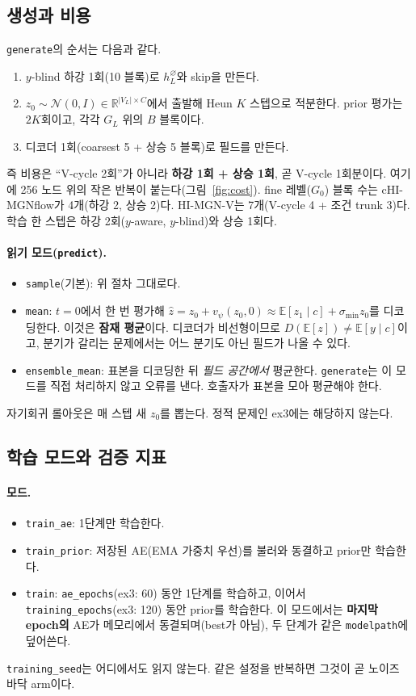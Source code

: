 \documentclass[11pt]{article}
\newcommand{\E}{\mathbb{E}}
\newcommand{\N}{\mathcal{N}}
\newcommand{\R}{\mathbb{R}}
\newcommand{\code}[1]{\texttt{#1}}
\begin{document}
\subsection{생성과 비용}\label{sec:chi-cost}

\code{generate}의 순서는 다음과 같다.
\begin{enumerate}
\item $y$-blind 하강 1회(10 블록)로 $h_L^{\varnothing}$와 skip을 만든다.
\item $z_0\sim\N(0,I)\in\R^{|V_L|\times C}$에서 출발해 Heun $K$ 스텝으로
  적분한다. prior 평가는 $2K$회이고, 각각 $G_L$ 위의 $B$ 블록이다.
\item 디코더 1회(coarsest 5 + 상승 5 블록)로 필드를 만든다.
\end{enumerate}
즉 비용은 ``V-cycle 2회''가 아니라 \textbf{하강 1회 + 상승 1회}, 곧 V-cycle
1회분이다. 여기에 256 노드 위의 작은 반복이 붙는다(그림~\ref{fig:cost}).
fine 레벨($G_0$) 블록 수는 cHI-MGNflow가 4개(하강 2, 상승 2)다. HI-MGN-V는
7개(V-cycle 4 + 조건 trunk 3)다. 학습 한 스텝은 하강 2회($y$-aware, $y$-blind)와
상승 1회다.

\paragraph{읽기 모드(\code{predict}).}
\begin{itemize}
\item \code{sample}(기본): 위 절차 그대로다.
\item \code{mean}: $t=0$에서 한 번 평가해 $\hat z = z_0 + v_\psi(z_0, 0) \approx
  \E[z_1\mid c] + \sigma_{\min}z_0$를 디코딩한다. 이것은 \textbf{잠재 평균}이다.
  디코더가 비선형이므로 $D(\E[z])\neq\E[y\mid c]$이고, 분기가 갈리는 문제에서는
  어느 분기도 아닌 필드가 나올 수 있다.
\item \code{ensemble\_mean}: 표본을 디코딩한 뒤 \emph{필드 공간에서} 평균한다.
  \code{generate}는 이 모드를 직접 처리하지 않고 오류를 낸다. 호출자가
  표본을 모아 평균해야 한다.
\end{itemize}
자기회귀 롤아웃은 매 스텝 새 $z_0$를 뽑는다. 정적 문제인 ex3에는 해당하지
않는다.

\subsection{학습 모드와 검증 지표}

\paragraph{모드.}
\begin{itemize}
\item \code{train\_ae}: 1단계만 학습한다.
\item \code{train\_prior}: 저장된 AE(EMA 가중치 우선)를 불러와 동결하고
  prior만 학습한다.
\item \code{train}: \code{ae\_epochs}(ex3: 60) 동안 1단계를 학습하고, 이어서
  \code{training\_epochs}(ex3: 120) 동안 prior를 학습한다. 이 모드에서는
  \textbf{마지막 epoch의} AE가 메모리에서 동결되며(best가 아님), 두 단계가
  같은 \code{modelpath}에 덮어쓴다.
\end{itemize}
\code{training\_seed}는 어디에서도 읽지 않는다. 같은 설정을 반복하면 그것이
곧 노이즈 바닥 arm이다.
\end{document}
